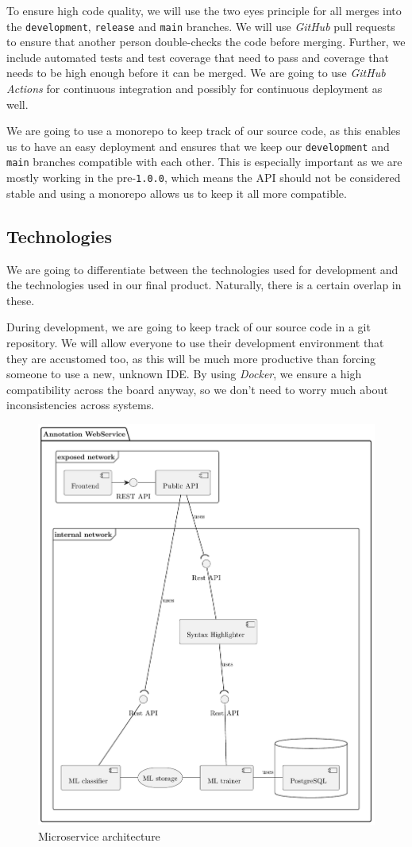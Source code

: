 \documentclass[11pt]{article}
\begin{document}
To ensure high code quality, we will use the two eyes principle for all merges into the \texttt{development}, \texttt{release} and \texttt{main} branches. We will use \textit{GitHub} pull requests to ensure that another person double-checks the code before merging. Further, we include automated tests and test coverage that need to pass and coverage that needs to be high enough before it can be merged. We are going to use \textit{GitHub Actions} for continuous integration and possibly for continuous deployment as well.

We are going to use a monorepo to keep track of our source code, as this enables us to have an easy deployment and ensures that we keep our \texttt{development} and \texttt{main} branches compatible with each other. This is especially important as we are mostly working in the pre-\texttt{1.0.0}, which means the API should not be considered stable and using a monorepo allows us to keep it all more compatible.


\subsection{Technologies}

We are going to differentiate between the technologies used for development and the technologies used in our final product. Naturally, there is a certain overlap in these.

During development, we are going to keep track of our source code in a git repository. We will allow everyone to use their development environment that they are accustomed too, as this will be much more productive than forcing someone to use a new, unknown IDE. By using \textit{Docker}, we ensure a high compatibility across the board anyway, so we don't need to worry much about inconsistencies across systems.

\begin{figure}
    \centering
    \includegraphics[width=0.5\linewidth]{illustations/architecture.pdf}
    \caption{Microservice architecture}
    \label{fig:uml_architecture}
\end{figure}
\end{document}
